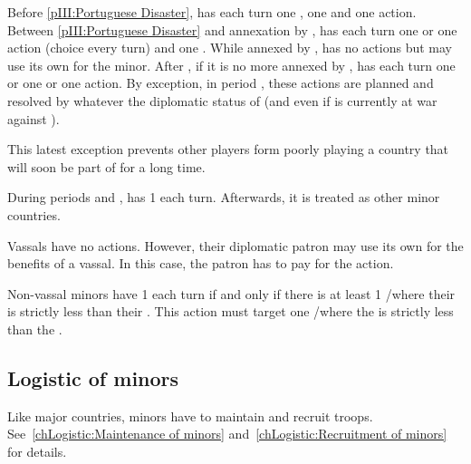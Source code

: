 \aparag[Portugal]
\bparag Before \ref{pIII:Portuguese Disaster}, \paysPortugal has each turn one
\COL, one \TP and one \TFI action.
\bparag Between \ref{pIII:Portuguese Disaster} and annexation by \HIS,
\paysPortugal has each turn one \COL or one \TP action (choice every turn) and
one \TFI.
\bparag While annexed by \HIS, \paysPortugal has no actions but \HIS may use
its own for the minor.
\bparag After , if it is no more annexed by \HIS,
\paysPortugal has each turn one \COL or one \TP or one \TFI action.
\bparag By exception, in period , these actions are planned and
resolved by \HIS whatever the diplomatic status of \paysPortugal (and even if
\HIS is currently at war against \paysPortugal).

\begin{designnote}
  This latest exception prevents other players form poorly playing a country
  that will soon be part of \HIS for a long time.
\end{designnote}


\aparag[Venice]
\bparag During periods  and , \paysVenise has 1 \TFI each
turn.
\bparag Afterwards, it is treated as other minor countries.

\aparag[Vassals]
\bparag Vassals have no actions. However, their diplomatic patron may use its
own \TFI for the benefits of a vassal.
\bparag In this case, the patron has to pay for the action.

\bparag Non-vassal minors have 1 \TFI each turn if and only if there is at
least 1 \CTZ/\STZ where their  is strictly less than
their .
\bparag This action must target one \CTZ/\STZ where the 
is strictly less than the .

\subsection{Logistic of minors}
\aparag Like major countries, minors have to maintain and recruit
troops. See~\ref{chLogistic:Maintenance of minors}
and~\ref{chLogistic:Recruitment of minors} for details.





